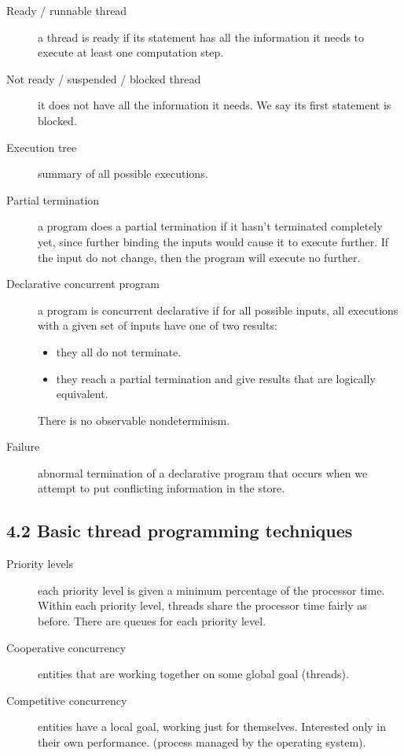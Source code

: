 \begin{description}
  \item[Ready / runnable thread] a thread is ready if its statement has all the information it needs to execute at least one computation step.
  \item[Not ready / suspended / blocked thread] it does not have all the information it needs.
    We say its first statement is blocked.
  \item[Execution tree] summary of all possible executions.
  \item[Partial termination] a program does a partial termination if it hasn't terminated completely yet, since further binding the inputs would cause it to execute further.
    If the input do not change, then the program will execute no further.
  \item[Declarative concurrent program] a program is concurrent declarative if for all possible inputs, all executions with a given set of inputs have one of two results:
    \begin{itemize}
      \item they all do not terminate.
      \item they reach a partial termination and give results that are logically equivalent.
    \end{itemize}
    There is no observable nondeterminism.
  \item[Failure] abnormal termination of a declarative program that occurs when we attempt to put conflicting information in the store.
\end{description}

\subsection{4.2 Basic thread programming techniques}

\begin{description}
  \item[Priority levels] each priority level is given a minimum percentage of the processor time.
    Within each priority level, threads share the processor time fairly as before.
    There are queues for each priority level.
  \item[Cooperative concurrency] entities that are working together on some global goal (threads).
  \item[Competitive concurrency] entities have a local goal, working just for themselves.
    Interested  only in their own performance.
    (process managed by the operating system).
\end{description}

